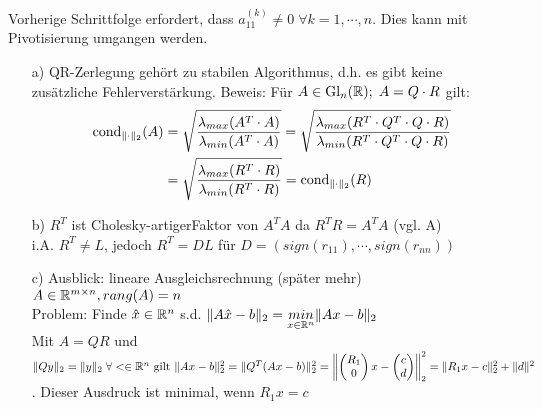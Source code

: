\begin{Bemerkung}
	Vorherige Schrittfolge erfordert, dass $a_{11}^{(k)} \neq 0 \;\forall k=1,\cdots,n$.
	Dies kann mit Pivotisierung umgangen werden. 
\end{Bemerkung}\hfill
\begin{weitere Bemerkungen}\hfill
	\begin{itemize}
		\item[a)]QR-Zerlegung gehört zu \glqq stabilen Algorithmus\grqq, d.h. es gibt keine zusätzliche Fehlerverstärkung.
Beweis: Für $A \in \mathrm{Gl}_n(\mathbb R); \; A = Q \cdot R$ gilt:
\begin{align*}
  \mathrm{cond}_{\| \cdot \|_2}(A) &= \sqrt{\frac{\lambda_{max}(A^T \cdot A)}{\lambda_{min}(A^T \cdot A)}} =
\sqrt{\frac{\lambda_{max}(R^T \cdot Q^T \cdot Q \cdot R)}{\lambda_{min}(R^T \cdot Q^T \cdot Q \cdot R)}} \\
&= \sqrt{\frac{\lambda_{max}(R^T \cdot R)}{\lambda_{min}(R^T \cdot R)}} = \mathrm{cond}_{\| \cdot \|_2}(R)
\end{align*}
		\item[b)]$R^T$ ist \glqq Cholesky-artiger\grqq Faktor von $A^TA$ da $R^TR=A^TA$ (vgl. A)\\ i.A. $R^T \neq L$, jedoch $R^T=DL$ für $D=(sign(r_{11}),\cdots,sign(r_{nn}))$
		\item[c)]Ausblick: lineare Ausgleichsrechnung (später mehr)\\
		$A \in\mathbb R^{m\times n}, rang(A)=n$\\
		Problem: Finde $\hat{x} \in \mathbb R^n$ s.d. $\|A\hat{x}-b\|_2=\underset{x\in\mathbb R^n}{min}\|Ax-b\|_2$\\
		Mit $A=QR$ und $\|Qy\|_2=\|y\|_2 \;\forall < \in \mathbb R^n \text{ gilt }\\
      \|Ax-b\|_2^2=\|Q^T(Ax-b)\|_2^2=\left\|\begin{pmatrix}R_1\\0\end{pmatrix}x-\begin{pmatrix}c\\d\end{pmatrix}\right\|_2^2 = \|R_1x-c\|_2^2 + \|d\|^2$. Dieser Ausdruck ist minimal, wenn $R_1x=c$
	\end{itemize}
\end{weitere Bemerkungen}
